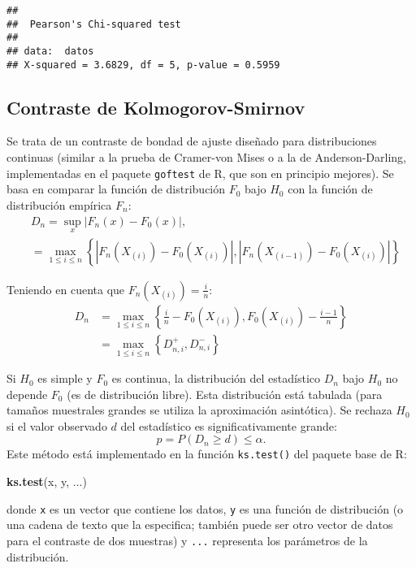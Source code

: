 \documentclass[
]{book}
\newenvironment{Shaded}{\begin{snugshade}}{\end{snugshade}}
\newcommand{\KeywordTok}[1]{\textcolor[rgb]{0.13,0.29,0.53}{\textbf{#1}}}
\newcommand{\NormalTok}[1]{#1}
\theoremstyle{break}
\theoremstyle{definition}
\theoremstyle{definition}
\theoremstyle{definition}
\theoremstyle{remark}
\begin{document}
\begin{verbatim}
## 
##  Pearson's Chi-squared test
## 
## data:  datos
## X-squared = 3.6829, df = 5, p-value = 0.5959
\end{verbatim}

\hypertarget{contraste-de-kolmogorov-smirnov}{%
\subsection{Contraste de Kolmogorov-Smirnov}\label{contraste-de-kolmogorov-smirnov}}

Se trata de un contraste de bondad de ajuste diseñado para distribuciones continuas
(similar a la prueba de Cramer-von Mises o a la de Anderson-Darling, implementadas en el paquete \texttt{goftest} de R, que son en principio mejores).
Se basa en comparar la función de distribución \(F_0\) bajo \(H_0\) con la función de distribución empírica \(F_n\):
\[\begin{aligned}
& D_n=\sup_{x}|F_n(x)-F_0(x)|,\\
& = \max_{1 \leq i \leq n} \left\{ |F_n(X_{(i)})-F_0(X_{(i)})|,|F_n(X_{(i-1)})-F_0(X_{(i)})| \right\}
\end{aligned}\]

Teniendo en cuenta que \(F_n\left( X_{(i)}\right) = \frac{i}n\):
\[\begin{aligned}
D_n  & =\max_{1\leq i\leq n}\left \{  \frac{i}n-F_0(X_{(i)}),F_0(X_{(i)})-\frac{i-1}n\right \} \\
& =\max_{1\leq i\leq n}\left \{  D_{n,i}^{+},D_{n,i}^{-}\right \}
\end{aligned}\]

Si \(H_0\) es simple y \(F_0\) es continua, la distribución del estadístico \(D_n\) bajo \(H_0\) no depende \(F_0\) (es de distribución libre).
Esta distribución está tabulada (para tamaños muestrales grandes se utiliza la aproximación asintótica).
Se rechaza \(H_0\) si el valor observado \(d\) del estadístico es significativamente grande:
\[p = P \left( D_n \geq d \right) \leq \alpha.\]
Este método está implementado en la función \texttt{ks.test()} del paquete base de R:

\begin{Shaded}
\begin{Highlighting}[]
\KeywordTok{ks.test}\NormalTok{(x, y, ...)}
\end{Highlighting}
\end{Shaded}

donde \texttt{x} es un vector que contiene los datos, \texttt{y} es una función de distribución
(o una cadena de texto que la especifica; también puede ser otro vector de datos
para el contraste de dos muestras) y \texttt{...} representa los parámetros de la distribución.
\end{document}
